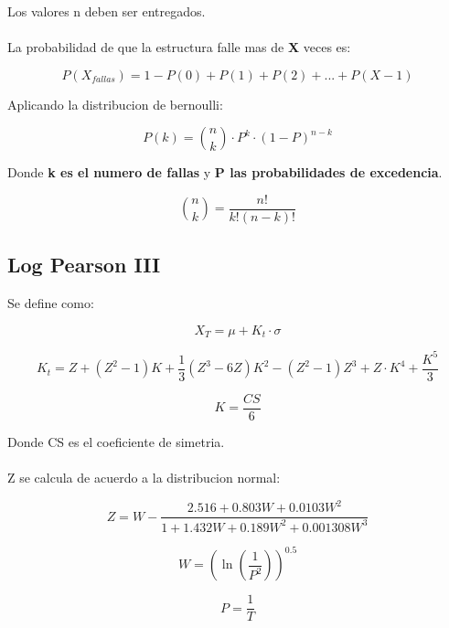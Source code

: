 Los valores n deben ser entregados.
\\ \\
La probabilidad de que la estructura falle mas de \textbf{X} veces es:

\begin{equation}
    P(X_{fallas}) = 1 - P(0) + P(1) + P(2) + ... + P(X-1)
\end{equation}

Aplicando la distribucion de bernoulli:

\begin{equation}
    P(k) = \binom{n}{k} \cdot P^k \cdot (1-P)^{n-k}
\end{equation}

Donde \textbf{k es el numero de fallas} y \textbf{P las probabilidades de excedencia}.

\begin{equation}
    \binom{n}{k} = \frac{n!}{k!(n-k)!}
\end{equation}

\subsection{Log Pearson III}

Se define como:

\begin{equation}
    X_T = \mu + K_t \cdot \sigma
\end{equation}

\begin{equation}
    K_t = Z + (Z^2 - 1)K + \frac{1}{3}(Z^3 - 6Z)K^2 - (Z^2-1)Z^3 + Z\cdot K^4 + \frac{K^5}{3}
\end{equation}

\begin{equation}
    K = \frac{CS}{6}
\end{equation}

Donde CS es el coeficiente de simetria.
\\ \\
Z se calcula de acuerdo a la distribucion normal:

\begin{equation}
    Z = W -  \frac{2.516 + 0.803W + 0.0103W^2}{1 + 1.432W + 0.189W^2 + 0.001308W^3}
\end{equation}

\begin{equation}
    W = (\ln(\frac{1}{P^2}))^{0.5}
\end{equation}

\begin{equation}
    P = \frac{1}{T}
\end{equation}

